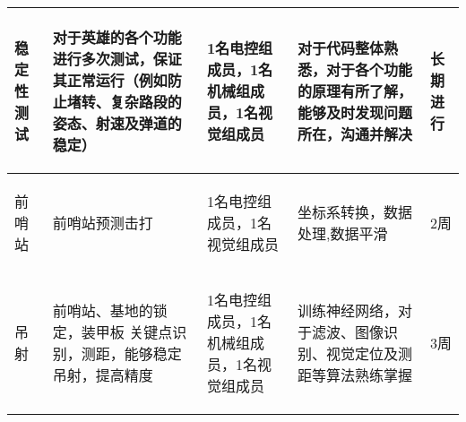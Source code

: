 \begin{longtable}{ p{2cm} | p{3cm} | p{3cm} | p{4.8cm} | p{2cm} |}
    \hline

        \begin{center}
            稳定性测试
        \end{center} &
        \begin{center}
            对于英雄的各个功能进行多次测试，保证其正常运行（例如防止堵转、复杂路段的姿态、射速及弹道的稳定）
        \end{center} &
        \begin{center}
            1名电控组成员，1名机械组成员，1名视觉组成员
        \end{center} &
        \begin{center}
            对于代码整体熟悉，对于各个功能的原理有所了解，能够及时发现问题所在，沟通并解决
        \end{center} &
        \begin{center}
            长期进行
        \end{center} \\

    \hline

    
        \begin{center}
            前哨站
        \end{center} &
        \begin{center}
            前哨站预测击打
        \end{center} &
        \begin{center}
            1名电控组成员，1名视觉组成员
        \end{center} &
        \begin{center}
            坐标系转换，数据处理,数据平滑
        \end{center} &
        \begin{center}
            2周
        \end{center} \\

    \hline

        \begin{center}
            吊射
        \end{center} &
        \begin{center}
            前哨站、基地的锁定，装甲板 关键点识别，测距，能够稳定吊射，提高精度
        \end{center} &
        \begin{center}
            1名电控组成员，1名机械组成员，1名视觉组成员
        \end{center} &
        \begin{center}
            训练神经网络，对于滤波、图像识别、视觉定位及测距等算法熟练掌握
        \end{center} &
        \begin{center}
            3周
        \end{center} \\

    \hline
    
\end{longtable}
